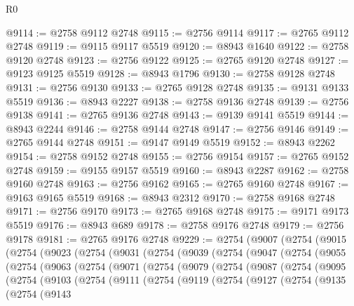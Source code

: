 \begin{lexlean}{R0}
\begin{coremodule}
@9114 := @2758 @9112 @2748
@9115 := @2756 @9114
@9117 := @2765 @9112 @2748
@9119 := @9115 @9117 @5519
@9120 := @8943 @1640
@9122 := @2758 @9120 @2748
@9123 := @2756 @9122
@9125 := @2765 @9120 @2748
@9127 := @9123 @9125 @5519
@9128 := @8943 @1796
@9130 := @2758 @9128 @2748
@9131 := @2756 @9130
@9133 := @2765 @9128 @2748
@9135 := @9131 @9133 @5519
@9136 := @8943 @2227
@9138 := @2758 @9136 @2748
@9139 := @2756 @9138
@9141 := @2765 @9136 @2748
@9143 := @9139 @9141 @5519
@9144 := @8943 @2244
@9146 := @2758 @9144 @2748
@9147 := @2756 @9146
@9149 := @2765 @9144 @2748
@9151 := @9147 @9149 @5519
@9152 := @8943 @2262
@9154 := @2758 @9152 @2748
@9155 := @2756 @9154
@9157 := @2765 @9152 @2748
@9159 := @9155 @9157 @5519
@9160 := @8943 @2287
@9162 := @2758 @9160 @2748
@9163 := @2756 @9162
@9165 := @2765 @9160 @2748
@9167 := @9163 @9165 @5519
@9168 := @8943 @2312
@9170 := @2758 @9168 @2748
@9171 := @2756 @9170
@9173 := @2765 @9168 @2748
@9175 := @9171 @9173 @5519
@9176 := @8943 @689
@9178 := @2758 @9176 @2748
@9179 := @2756 @9178
@9181 := @2765 @9176 @2748
@9229 := @2754
    (@9007
      (@2754
        (@9015
          (@2754
            (@9023
              (@2754
                (@9031
                  (@2754
                    (@9039
                      (@2754
                        (@9047
                          (@2754
                            (@9055
                              (@2754
                                (@9063
                                  (@2754
                                    (@9071
                                      (@2754
                                        (@9079
                                          (@2754
                                            (@9087
                                              (@2754
                                                (@9095
                                                  (@2754
                                                    (@9103
                                                      (@2754
                                                        (@9111
                                                          (@2754
                                                            (@9119
                                                              (@2754
                                                                (@9127
                                                                  (@2754
                                                                    (@9135
                                                                      (@2754
                                                                        (@9143

\end{coremodule}
\end{lexlean}
